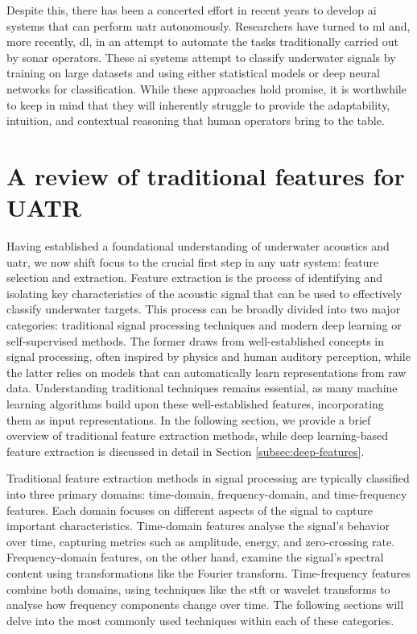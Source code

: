 Despite this, there has been a concerted effort in recent years to develop \acrshort{ai} systems that can perform \acrshort{uatr} autonomously. Researchers have turned to \acrlong{ml} and, more recently, \acrlong{dl}, in an attempt to automate the tasks traditionally carried out by sonar operators. These \acrshort{ai} systems attempt to classify underwater signals by training on large datasets and using either statistical models or deep neural networks for classification. While these approaches hold promise, it is worthwhile to keep in mind that they will inherently struggle to provide the adaptability, intuition, and contextual reasoning that human operators bring to the table.

\section{A review of traditional features for UATR}\label{sec:traditional-features}

Having established a foundational understanding of underwater acoustics and \acrlong{uatr}, we now shift focus to the crucial first step in any \acrshort{uatr} system: feature selection and extraction. Feature extraction is the process of identifying and isolating key characteristics of the acoustic signal that can be used to effectively classify underwater targets. This process can be broadly divided into two major categories: traditional signal processing techniques and modern deep learning or self-supervised methods. The former draws from well-established concepts in signal processing, often inspired by physics and human auditory perception, while the latter relies on models that can automatically learn representations from raw data. Understanding traditional techniques remains essential, as many machine learning algorithms build upon these well-established features, incorporating them as input representations. In the following section, we provide a brief overview of traditional feature extraction methods, while deep learning-based feature extraction is discussed in detail in Section \ref{subsec:deep-features}.


Traditional feature extraction methods in signal processing are typically classified into three primary domains: time-domain, frequency-domain, and time-frequency features. Each domain focuses on different aspects of the signal to capture important characteristics. Time-domain features analyse the signal's behavior over time, capturing metrics such as amplitude, energy, and zero-crossing rate. Frequency-domain features, on the other hand, examine the signal's spectral content using transformations like the Fourier transform. Time-frequency features combine both domains, using techniques like the \acrshort{stft} or wavelet transforms to analyse how frequency components change over time. The following sections will delve into the most commonly used techniques within each of these categories.

